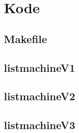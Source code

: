 \chapter{Kode}
\section{Makefile}
\label{Code_make}

\clearpage
\section{listmachineV1}
\label{Code_V1}

\clearpage
\section{listmachineV2}
\label{Code_V2}

\clearpage
\section{listmachineV3}
\label{Code_V2}

\clearpage